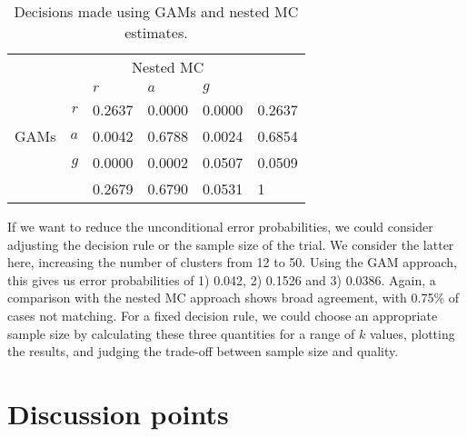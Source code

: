 \documentclass{article} %
\begin{document}
\begin{table}
\centering
\begin{tabular}{r r l l l l}
\toprule
& & \multicolumn{3}{c}{Nested MC} & \\
& & $r$ & $a$ & $g$ & \\
\midrule
\multirow{3}{*}{GAMs} & $r$ & 0.2637 & 0.0000 & 0.0000 & 0.2637 \\
 & $a$ & 0.0042 & 0.6788 & 0.0024 & 0.6854 \\
 & $g$ & 0.0000 & 0.0002 & 0.0507 & 0.0509 \\
 \midrule
 & & 0.2679 & 0.6790 & 0.0531 & 1 \\
\bottomrule
\end{tabular}
\caption{Decisions made using GAMs and nested MC estimates.}
\label{tab:comparison}
\end{table}

If we want to reduce the unconditional error probabilities, we could consider adjusting the decision rule or the sample size of the trial. We consider the latter here, increasing the number of clusters from 12 to 50. Using the GAM approach, this gives us error probabilities of 1) 0.042, 2) 0.1526 and 3) 0.0386. Again, a comparison with the nested MC approach shows broad agreement, with 0.75\% of cases not matching. For a fixed decision rule, we could choose an appropriate sample size by calculating these three quantities for a range of $k$ values, plotting the results, and judging the trade-off between sample size and quality.

\section{Discussion points}
\end{document}
